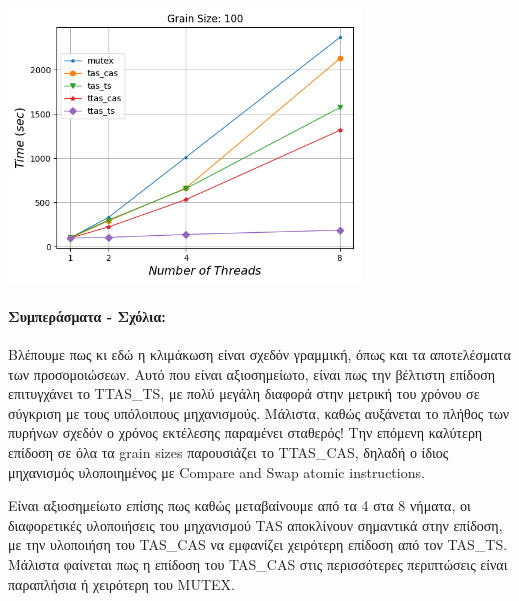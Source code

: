 \begin{minipage}{\textwidth}
   \begin{center}
      \\
      \vspace{3mm}
      \includegraphics[width=0.7\textwidth]{./graphs/real/time/grain-100.png}
      \vspace{6mm}
   \end{center}
\end{minipage}

\paragraph{Συμπεράσματα - Σχόλια:}
Βλέπουμε πως κι εδώ η κλιμάκωση είναι σχεδόν γραμμική, όπως και τα αποτελέσματα
των προσομοιώσεων. Αυτό που είναι αξιοσημείωτο, είναι πως την βέλτιστη επίδοση
επιτυγχάνει το TTAS\_TS, με πολύ μεγάλη διαφορά στην μετρική του χρόνου σε
σύγκριση με τους υπόλοιπους μηχανισμούς. Μάλιστα, καθώς αυξάνεται το πλήθος των
πυρήνων σχεδόν ο χρόνος εκτέλεσης παραμένει σταθερός! 
Την επόμενη καλύτερη επίδοση σε όλα τα grain sizes παρουσιάζει το TTAS\_CAS,
δηλαδή ο ίδιος μηχανισμός υλοποιημένος με Compare and Swap atomic instructions. 

Είναι αξιοσημείωτο επίσης πως καθώς μεταβαίνουμε από τα 4 στα 8 νήματα, οι διαφορετικές
υλοποιήσεις του μηχανισμού TAS αποκλίνουν σημαντικά στην επίδοση, με την υλοποιήση του
TAS\_CAS να εμφανίζει χειρότερη επίδοση από τον TAS\_TS. Μάλιστα φαίνεται πως η επίδοση
του TAS\_CAS στις περισσότερες περιπτώσεις είναι παραπλήσια ή χειρότερη του MUTEX.
